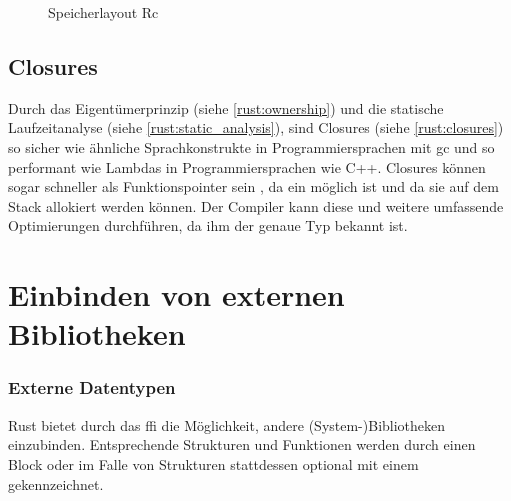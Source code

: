 \begin{figure}[H]
	\caption{Speicherlayout Rc \cite[90-91]{rust:orly_programming}}
\end{figure}

\subsection{Closures}
\label{rust:zero_cost:closures}

Durch das Eigentümerprinzip (siehe \autoref{rust:ownership}) und die statische Laufzeitanalyse (siehe \autoref{rust:static_analysis}), sind Closures (siehe \autoref{rust:closures}) so sicher wie ähnliche Sprachkonstrukte in Programmiersprachen mit \gls{gc} und so performant wie Lambdas in Programmiersprachen wie C++.
Closures können sogar schneller als Funktionspointer sein \cite [310]{rust:orly_programming}, da ein  möglich ist und da sie auf dem Stack allokiert werden können.
Der Compiler kann diese und weitere umfassende Optimierungen durchführen, da ihm der genaue Typ bekannt ist.



\section{Einbinden von externen Bibliotheken}

\subsubsection{Externe Datentypen}
\label{rust:ffi}
\label{rust:ffi:datatypes}

Rust bietet durch das \gls{ffi}  die Möglichkeit, andere (System-)Bibliotheken einzubinden.
Entsprechende Strukturen und Funktionen werden durch einen  Block
oder im Falle von Strukturen stattdessen optional mit einem \rustcinline{#[repr(C)]} gekennzeichnet.

